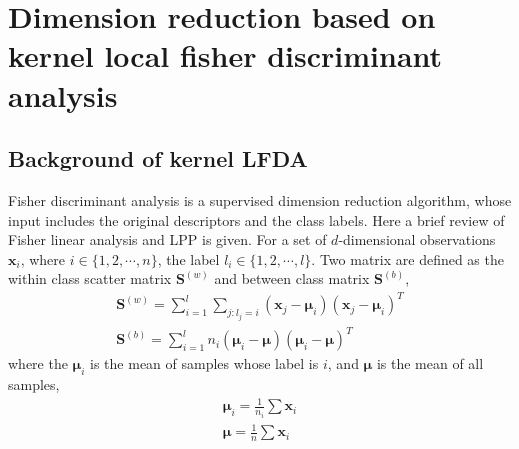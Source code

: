 \documentclass[conference,compsoc]{IEEEtran}
\begin{document}
\section{Dimension reduction based on kernel local fisher discriminant analysis }
\subsection{Background of kernel LFDA}

Fisher discriminant analysis is a supervised dimension reduction algorithm, whose input includes the original descriptors and the class labels. Here a brief review of Fisher linear analysis and LPP is given. For a set of $d$-dimensional observations $\bm{x}_i$, where $i\in\{1,2,\cdots,n\}$, the label $l_i\in\{1,2,\cdots,l\}$. Two matrix are defined as the within class scatter matrix $\bm{S}^{(w)}$ and between class matrix
$\bm{S}^{(b)}$, 
\begin{equation}
\begin{aligned}
\bm{S}^{(w)} = \mathop{\sum} _{i=1}^l\mathop{\sum}_{j:l_j = i} (\bm{x}_j - \bm{\mu}_i)(\bm{x}_j - \bm{\mu}_i)^T \\
\bm{S}^{(b)} = \mathop{\sum} _{i=1}^l n_i(\bm{\mu}_i - \bm{\mu})(\bm{\mu}_i - \bm{\mu})^T
\end{aligned}
\end{equation}
where the $\bm{\mu}_i$ is the mean of samples whose label is $i$, and $\bm{\mu}$ is the mean of all samples,
\begin{equation}
\begin{aligned}
\bm{\mu}_i = \frac{1}{n_i} \sum \bm{x}_i \\
\bm{\mu} = \frac{1}{n} \sum \bm{x}_i
\end{aligned}
\end{equation}
\end{document}
